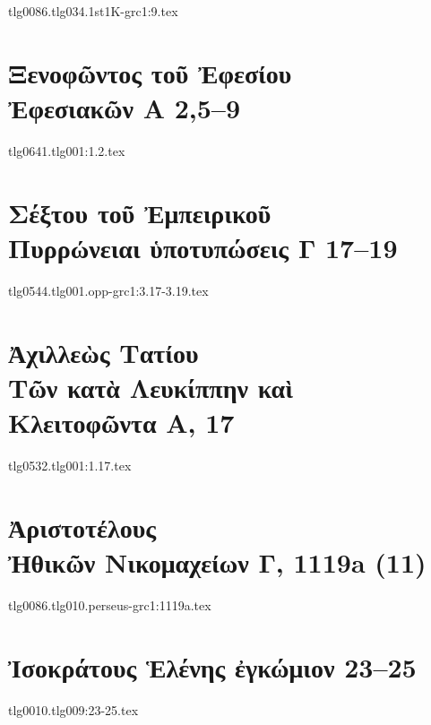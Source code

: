 \documentclass[a4paper,12pt,twoside]{report}
\begin{document}
{tlg0086.tlg034.1st1K-grc1:9.tex}

\chapter[Ξενοφῶντος τοῦ Ἐφεσίου Ἐφεσιακῶν Α]{\textgreek[variant=ancient]{Ξενοφῶντος τοῦ Ἐφεσίου \\Ἐφεσιακῶν Α} 2,5–9}

{tlg0641.tlg001:1.2.tex}

\chapter[Σέξτου τοῦ Ἐμπειρικοῦ Πυρρώνειαι\dots\ Γ 17–19]{\textgreek[variant=ancient]{Σέξτου τοῦ Ἐμπειρικοῦ \\Πυρρώνειαι ὑποτυπώσεις Γ} 17–19}

{tlg0544.tlg001.opp-grc1:3.17-3.19.tex}


\chapter[Ἀχιλλεὼς Τατίου Τῶν κατὰ Λευκίππην\dots]{\textgreek[variant=ancient]{Ἀχιλλεὼς Τατίου \\Τῶν κατὰ Λευκίππην καὶ\\ Κλειτοφῶντα Α,} 17}

{tlg0532.tlg001:1.17.tex}



\chapter[Ἀριστοτέλους Ἠθικῶν Νικομαχείων Γ]{\textgreek[variant=ancient]{Ἀριστοτέλους \\Ἠθικῶν Νικομαχείων Γ,} 1119a (11)}

{tlg0086.tlg010.perseus-grc1:1119a.tex}



\chapter[Ἰσοκράτους Ἑλένης ἐγκώμιον 23]{\textgreek[variant=ancient]{Ἰσοκράτους Ἑλένης ἐγκώμιον} 23–25}

{tlg0010.tlg009:23-25.tex}
\end{document}
